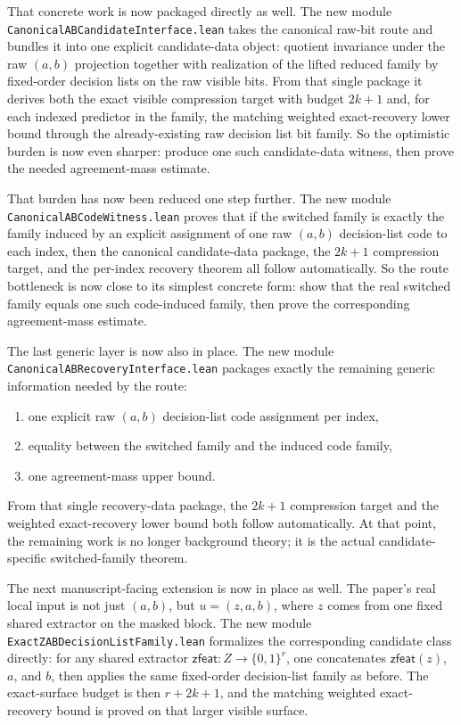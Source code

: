 \documentclass[11pt]{article}
\theoremstyle{remark}
\begin{document}
That concrete work is now packaged directly as well.  The new module
\texttt{CanonicalABCandidateInterface.lean} takes the canonical raw-bit route
and bundles it into one explicit candidate-data object: quotient invariance
under the raw \((a,b)\) projection together with realization of the lifted
reduced family by fixed-order decision lists on the raw visible bits.  From
that single package it derives both the exact visible compression target with
budget \(2k+1\) and, for each indexed predictor in the family, the matching
weighted exact-recovery lower bound through the already-existing raw decision
list bit family.  So the optimistic burden is now even sharper: produce one
such candidate-data witness, then prove the needed agreement-mass estimate.

That burden has now been reduced one step further.  The new module
\texttt{CanonicalABCodeWitness.lean} proves that if the switched family is
exactly the family induced by an explicit assignment of one raw \((a,b)\)
decision-list code to each index, then the canonical candidate-data package,
the \(2k+1\) compression target, and the per-index recovery theorem all follow
automatically.  So the route bottleneck is now close to its simplest concrete
form: show that the real switched family equals one such code-induced family,
then prove the corresponding agreement-mass estimate.

The last generic layer is now also in place.  The new module
\texttt{CanonicalABRecoveryInterface.lean} packages exactly the remaining
generic information needed by the route:
\begin{enumerate}[leftmargin=1.5em]
  \item one explicit raw \((a,b)\) decision-list code assignment per index,
  \item equality between the switched family and the induced code family,
  \item one agreement-mass upper bound.
\end{enumerate}
From that single recovery-data package, the \(2k+1\) compression target and the
weighted exact-recovery lower bound both follow automatically.  At that point,
the remaining work is no longer background theory; it is the actual
candidate-specific switched-family theorem.

The next manuscript-facing extension is now in place as well.  The paper's real
local input is not just \((a,b)\), but \(u=(z,a,b)\), where \(z\) comes from one
fixed shared extractor on the masked block.  The new module
\texttt{ExactZABDecisionListFamily.lean} formalizes the corresponding candidate
class directly: for any shared extractor \(\mathsf{zfeat}: Z \to \{0,1\}^r\), one
concatenates \(\mathsf{zfeat}(z)\), \(a\), and \(b\), then applies the same
fixed-order decision-list family as before.  The exact-surface budget is then
\(r+2k+1\), and the matching weighted exact-recovery bound is proved on that
larger visible surface.
\end{document}
